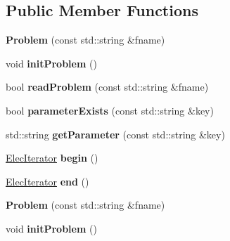 \subsection*{Public Member Functions}
\begin{DoxyCompactItemize}
\item 
{\bfseries Problem} (const std\+::string \&fname)\hypertarget{classphys_1_1Problem_a9c039a884ca21b19e7594b2c1e38fc41}{}\label{classphys_1_1Problem_a9c039a884ca21b19e7594b2c1e38fc41}

\item 
void {\bfseries init\+Problem} ()\hypertarget{classphys_1_1Problem_a745c5dc00a0f401600f1cd32754b4ea8}{}\label{classphys_1_1Problem_a745c5dc00a0f401600f1cd32754b4ea8}

\item 
bool {\bfseries read\+Problem} (const std\+::string \&fname)\hypertarget{classphys_1_1Problem_acf7d99d84137c03546860be5151f0ad9}{}\label{classphys_1_1Problem_acf7d99d84137c03546860be5151f0ad9}

\item 
bool {\bfseries parameter\+Exists} (const std\+::string \&key)\hypertarget{classphys_1_1Problem_a055222faa9d3e4e2762f8b8e7e84686e}{}\label{classphys_1_1Problem_a055222faa9d3e4e2762f8b8e7e84686e}

\item 
std\+::string {\bfseries get\+Parameter} (const std\+::string \&key)\hypertarget{classphys_1_1Problem_a2c0c4e5f6955c58bd55c9fee3b257d79}{}\label{classphys_1_1Problem_a2c0c4e5f6955c58bd55c9fee3b257d79}

\item 
\hyperlink{classphys_1_1Problem_1_1ElecIterator}{Elec\+Iterator} {\bfseries begin} ()\hypertarget{classphys_1_1Problem_ab7cb3ea9bed0d5df51ccb8dee77e5419}{}\label{classphys_1_1Problem_ab7cb3ea9bed0d5df51ccb8dee77e5419}

\item 
\hyperlink{classphys_1_1Problem_1_1ElecIterator}{Elec\+Iterator} {\bfseries end} ()\hypertarget{classphys_1_1Problem_aef9dfeed4e18ecf5c38ef05a70fc13ce}{}\label{classphys_1_1Problem_aef9dfeed4e18ecf5c38ef05a70fc13ce}

\item 
{\bfseries Problem} (const std\+::string \&fname)\hypertarget{classphys_1_1Problem_a71db2d27bfb62037435f9d1ddbde1d9f}{}\label{classphys_1_1Problem_a71db2d27bfb62037435f9d1ddbde1d9f}

\item 
void {\bfseries init\+Problem} ()\hypertarget{classphys_1_1Problem_af81dd636e86ef1f3f041e7acab5716a0}{}\label{classphys_1_1Problem_af81dd636e86ef1f3f041e7acab5716a0}


\end{DoxyCompactItemize}

